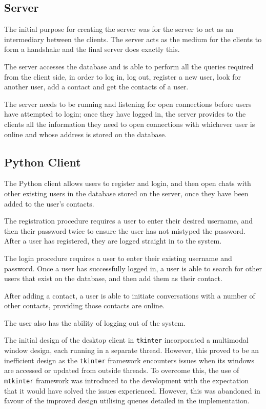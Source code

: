 \documentclass[finalReport.tex]{subfiles}
\begin{document}
\subsection{Server}
The initial purpose for creating the server was for the server to act as an intermediary between the clients. The server acts as the medium for the clients to form a handshake and the final server does exactly this.

The server accesses the database and is able to perform all the queries required from the client side, in order to log in, log out, register a new user, look for another user, add a contact and get the contacts of a user. 

The server needs to be running and listening for open connections before users have attempted to login; once they have logged in, the server provides to the clients all the information they need to open connections with whichever user is online and whose address is stored on the database.

\subsection{Python Client}
The Python client allows users to register and login, and then open chats with other existing users in the database stored on the server, once they have been added to the user's contacts. 

The registration procedure requires a user to enter their desired username, and then their password twice to ensure the user has not mistyped the password. After a user has registered, they are logged straight in to the system. 

The login procedure requires a user to enter their existing username and password. Once a user has successfully logged in, a user is able to search for other users that exist on the database, and then add them as their contact. 

After adding a contact, a user is able to initiate conversations with a number of other contacts, providing those contacts are online. 

The user also has the ability of logging out of the system.

The initial design of the desktop client in \lstinline'tkinter' incorporated a multimodal window design, each running in a separate thread. However, this proved to be an inefficient design as the \lstinline'tkinter' framework encounters issues when its windows are accessed or updated from outside threads. To overcome this, the use of \lstinline'mtkinter' framework was introduced to the development with the expectation that it would have solved the issues experienced. However, this was abandoned in favour of the improved design utilising queues detailed in the implementation.
\end{document}

